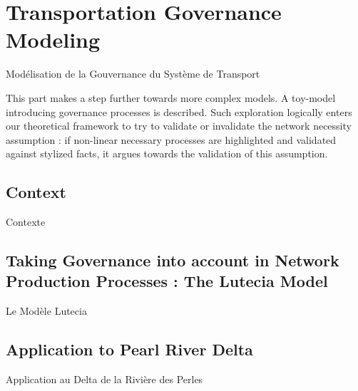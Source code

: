 




\section[Transportation Governance Modeling][Gouvernance du Système de Transport]{Transportation Governance Modeling}{Modélisation de la Gouvernance du Système de Transport} 

\label{sec:lutetia}



This part makes a step further towards more complex models. A toy-model introducing governance processes is described. Such exploration logically enters our theoretical framework to try to validate or invalidate the network necessity assumption : if non-linear necessary processes are highlighted and validated against stylized facts, it argues towards the validation of this assumption. 





\subsection{Context}{Contexte}


\subsection[The Lutecia Model][Le Modèle Lutecia]{Taking Governance into account in Network Production Processes : The Lutecia Model}{Le Modèle Lutecia}












\subsection[Application][Application]{Application to Pearl River Delta}{Application au Delta de la Rivière des Perles}





